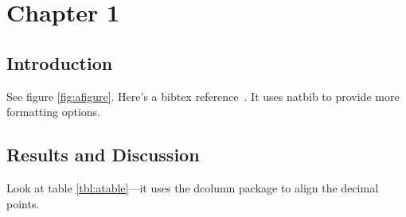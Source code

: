 \chapter{Chapter 1}

\section{\label{sec:intro}Introduction}
\par See figure \ref{fig:afigure}. Here's a bibtex reference~\citep{hohenberg:B864}. It uses natbib to provide more formatting options.

\par\lipsum
\section{\label{sec:results}Results and Discussion}
Look at table \ref{tbl:atable}---it uses the dcolumn package to align the decimal points.

\par\lipsum

